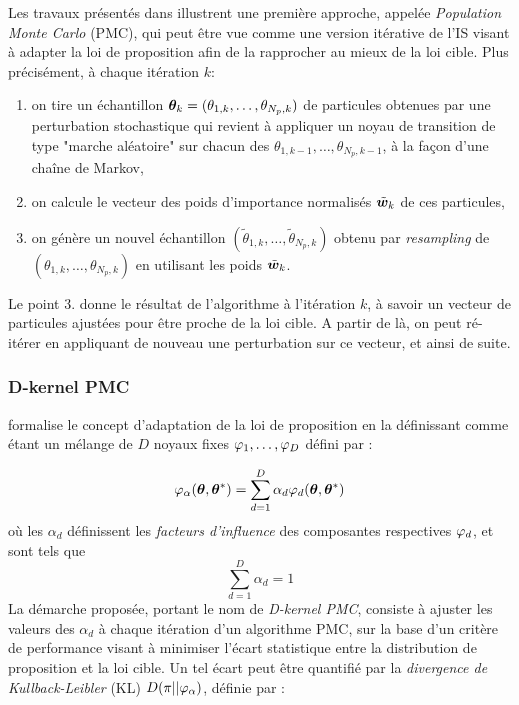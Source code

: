 Les travaux présentés dans \cite{Cappe2004} illustrent une première approche, appelée \textit{Population Monte Carlo} (PMC), qui peut être vue comme une version itérative de l'IS visant à adapter la loi de proposition afin de la rapprocher au mieux de la loi cible. Plus précisément, à chaque itération $k$: 
\begin{enumerate}
	\item on tire un échantillon ${\bm{\theta}}_k = (\theta_{1,k}, \dots, \theta_{N_p,k})$ de particules obtenues par une perturbation stochastique qui revient à appliquer un noyau de transition de type "marche aléatoire" sur chacun des $\theta_{1,k-1}, \dots, \theta_{N_p,k-1}$, à la façon d'une chaîne de Markov,
	\item on calcule le vecteur des poids d'importance normalisés ${\tilde{\bm{w}}}_k$ de ces particules,
	\item on génère un nouvel échantillon $(\tilde{\theta}_{1,k}, \dots, \tilde{\theta}_{N_p,k})$ obtenu par \textit{resampling} de $ (\theta_{1,k}, \dots, \theta_{N_p,k})$ en utilisant les poids ${\tilde{\bm{w}}}_k$.

\end{enumerate}

Le point 3. donne le résultat de l'algorithme à l'itération $k$, à savoir un vecteur de particules ajustées pour être proche de la loi cible. A partir de là, on peut ré-itérer en appliquant de nouveau une perturbation sur ce vecteur, et ainsi de suite. 


\subsubsection{D-kernel PMC}

\cite{Douc2007} formalise le concept d'adaptation de la loi de proposition en la définissant comme étant un mélange de $D$ noyaux fixes ${\varphi}_1, \dots, {\varphi}_D$ défini par : 

\begin{equation}
{\varphi}_\alpha({\bm{\theta}}, {{\bm{\theta}}^*}) = \sum\limits_{d=1}^D\alpha_d {\varphi}_d({\bm{\theta}}, {{\bm{\theta}}^*})
\label{eq_PMC_D_Kernel}
\end{equation}
où les $\alpha_d$ définissent les \textit{facteurs d'influence} des composantes respectives ${\varphi}_d$, et sont tels que $$\sum\limits_{d=1}^D \alpha_d = 1$$  La démarche proposée, portant le nom de \textit{D-kernel PMC}, consiste à ajuster les valeurs des $\alpha_d$ à chaque itération d'un algorithme PMC, sur la base d'un critère de performance visant à minimiser l'écart statistique entre la distribution de proposition et la loi cible. Un tel écart peut être quantifié par la \textit{divergence de Kullback-Leibler} (KL)  $D(\pi || {\varphi}_\alpha )$, définie par : 


